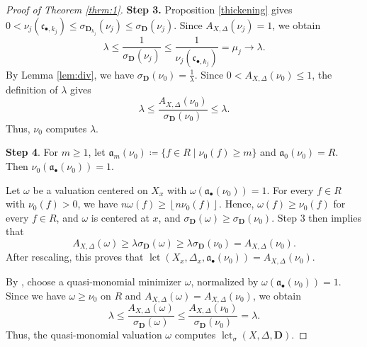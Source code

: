 \documentclass[a4paper,12pt]{amsart}
\theoremstyle{plain}
\theoremstyle{definition}
\numberwithin{equation}{section}
\def\lct{\operatorname{lct}}
\newcommand{\floor}[1]{\left\lfloor #1 \right\rfloor}
\begin{document}
\begin{proof}[Proof of Theorem \ref{thrm:1}]
\smallskip

\noindent\textbf{Step 3.} Proposition \ref{thickening} gives $0<\nu_j(\mathfrak{c}_{\bullet,k_j})\leq \sigma_{\mathbf{D}_{k_j}}(\nu_j)\leq \sigma_{\mathbf{D}}(\nu_j)$. Since $A_{X,\Delta}(\nu_j)=1$, we obtain
\[
\lambda\leq \frac{1}{\sigma_{\mathbf{D}}(\nu_j)}\leq \frac{1}{\nu_j(\mathfrak{c}_{\bullet,k_j})}=\mu_j\longrightarrow \lambda.
\]
By Lemma \ref{lem:div}, we have $\sigma_{\mathbf{D}}(\nu_0)=\frac{1}{\lambda}$. Since $0<A_{X,\Delta}(\nu_0)\leq 1$, the definition of $\lambda$ gives
\[
\lambda\leq \frac{A_{X,\Delta}(\nu_0)}{\sigma_{\mathbf{D}}(\nu_0)}\leq \lambda.
\]
Thus, $\nu_0$ computes $\lambda$.

\smallskip

\noindent\textbf{Step 4}. For $m\geq 1$, let $\mathfrak{a}_m(\nu_0)\coloneqq \{f\in R\mid \nu_0(f)\geq m\}$ and $\mathfrak{a}_0(\nu_0)=R$. Then $\nu_0(\mathfrak{a}_{\bullet}(\nu_0))=1$. 

Let $\omega$ be a valuation centered on $X_x$ with $\omega(\mathfrak{a}_{\bullet}(\nu_0))=1$. For every $f\in R$ with $\nu_0(f)>0$, we have $n\omega(f)\geq \floor{n\nu_0(f)}$. Hence, $\omega(f)\geq \nu_0(f)$ for every $f\in R$, and $\omega$ is centered at $x$, and $\sigma_{\mathbf{D}}(\omega)\geq \sigma_{\mathbf{D}}(\nu_0)$. Step 3 then implies that
\[
A_{X,\Delta}(\omega)\geq \lambda\sigma_{\mathbf{D}}(\omega)\geq \lambda\sigma_{\mathbf{D}}(\nu_0)=A_{X,\Delta}(\nu_0).
\]
After rescaling, this proves that $\lct(X_x,\Delta_x,\mathfrak{a}_{\bullet}(\nu_0))=A_{X,\Delta}(\nu_0)$.

By \cite[Theorem 1.1]{Xu20}, choose a quasi-monomial minimizer $\omega$, normalized by $\omega(\mathfrak{a}_{\bullet}(\nu_0))=1$. Since we have $\omega\geq \nu_0$ on $R$ and $A_{X,\Delta}(\omega)=A_{X,\Delta}(\nu_0)$, we obtain
\[
\lambda\leq \frac{A_{X,\Delta}(\omega)}{\sigma_{\mathbf{D}}(\omega)}\leq \frac{A_{X,\Delta}(\nu_0)}{\sigma_{\mathbf{D}}(\nu_0)}=\lambda.
\]
Thus, the quasi-monomial valuation $\omega$ computes $\lct_{\sigma}(X,\Delta,\mathbf{D})$.
\end{proof}
\end{document}
